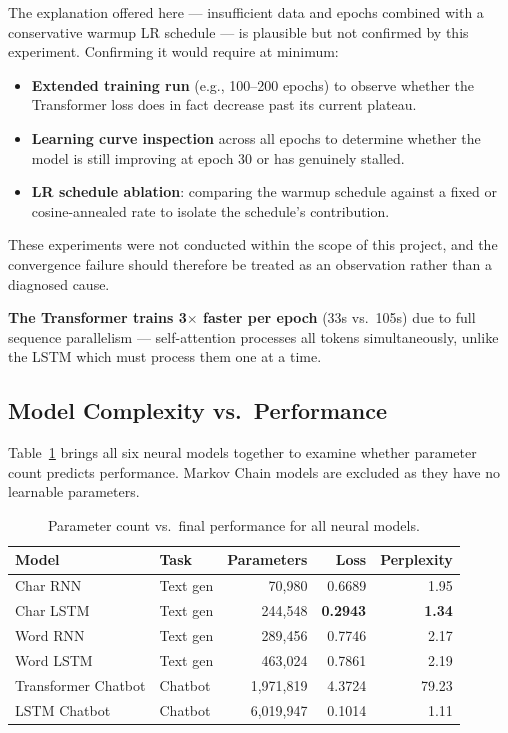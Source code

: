 The explanation offered here — insufficient data and epochs combined with a
conservative warmup LR schedule — is plausible but not confirmed by this experiment.
Confirming it would require at minimum:
\begin{itemize}
    \item \textbf{Extended training run} (e.g., 100--200 epochs) to observe whether
          the Transformer loss does in fact decrease past its current plateau.
    \item \textbf{Learning curve inspection} across all epochs to determine whether
          the model is still improving at epoch 30 or has genuinely stalled.
    \item \textbf{LR schedule ablation}: comparing the warmup schedule against a
          fixed or cosine-annealed rate to isolate the schedule's contribution.
\end{itemize}
These experiments were not conducted within the scope of this project, and the
convergence failure should therefore be treated as an observation rather than a
diagnosed cause.

\textbf{The Transformer trains 3$\times$ faster per epoch} (33s vs.\ 105s) due to
full sequence parallelism — self-attention processes all tokens simultaneously,
unlike the LSTM which must process them one at a time.

\subsection{Model Complexity vs.\ Performance}

Table~\ref{tab:complexity} brings all six neural models together to examine whether
parameter count predicts performance. Markov Chain models are excluded as they have
no learnable parameters.

\begin{table}[H]
\centering
\caption{Parameter count vs.\ final performance for all neural models.}
\label{tab:complexity}
\begin{tabular}{llrrr}
\toprule
\textbf{Model} & \textbf{Task} & \textbf{Parameters} & \textbf{Loss} & \textbf{Perplexity} \\
\midrule
Char RNN            & Text gen  &    70,980 & 0.6689 &  1.95 \\
Char LSTM           & Text gen  &   244,548 & \textbf{0.2943} & \textbf{1.34} \\
Word RNN            & Text gen  &   289,456 & 0.7746 &  2.17 \\
Word LSTM           & Text gen  &   463,024 & 0.7861 &  2.19 \\
Transformer Chatbot & Chatbot   & 1,971,819 & 4.3724 & 79.23 \\
LSTM Chatbot        & Chatbot   & 6,019,947 & 0.1014 &  1.11 \\
\bottomrule
\end{tabular}
\end{table}

